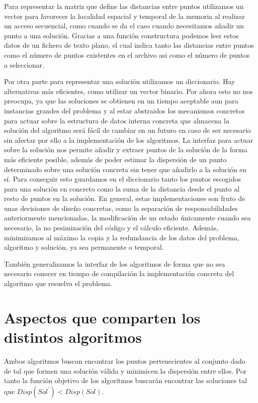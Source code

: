 Para representar la matriz que define las distancias entre puntos utilizamos un vector para favorecer la localidad espacial y
temporal de la memoria al realizar un acceso secuencial, como cuando se da el caso cuando necesitamos añadir un punto a una solución.
Gracias a una función constructura podemos leer estos datos de un fichero de texto plano, el cual indica tanto las distancias entre
puntos como el número de puntos existentes en el archivo asi como el número de puntos a seleccionar.

Por otra parte para representar una solución utilizamos un diccionario. Hay alternativas más eficientes, como utilizar un vector binario.
Por ahora esto no nos preocupa, ya que las soluciones se obtienen en un tiempo aceptable aun para instancias grandes del problema y 
al estar abstraidos los mecanismos concretos para actuar sobre la estructura de datos interna concreta que almacena la solución del
algoritmo será fácil de cambiar en un futuro en caso de ser necesario sin afectar por ello a la implementación de los algoritmos. La
interfaz para actuar sobre la solución nos permite añadir y extraer puntos de la solución de la forma más eficiente posible, además
de poder estimar la dispersión de un punto determinado sobre una solución concreta sin tener que añadirlo a la solución en sí. Para
conseguir esto guardamos en el diccionario tanto los puntos escogidos para una solución en concreto como la suma de la distancia desde
el punto al resto de puntos en la solución. En general, estas implementaciones son fruto de unas decisiones de diseño concretas, como la
separación de responsabilidades anteriormente mencionadas, la modificación de un estado únicamente cuando sea necesario, la no pesimización
del código y el cálculo eficiente. Además, minimizamos al máximo la copia y la redundancia de los datos del problema, algoritmo y solución,
ya sea permanente o temporal.

También generalizamos la interfaz de los algoritmos de forma que no sea necesario conocer en tiempo de compilación la implementación
concreta del algoritmo que resuelva el problema.

\section{Aspectos que comparten los distintos algoritmos}

Ambos algoritmos buscan encontrar los puntos pertenecientes al conjunto dado de tal que formen una solución válida y minimicen la dispersión
entre ellos. Por tanto la función objetivo de los algoritmos buscarán encontrar las soluciones tal que $ Disp(Sol^{\prime}) < Disp(Sol) $.

